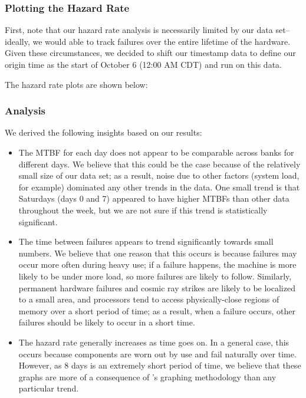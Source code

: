 \subsubsection{Plotting the Hazard Rate}

First, note that our hazard rate analysis is necessarily limited by our data set--ideally, we would able to track failures over the entire lifetime of the hardware.  Given these circumstances, we decided to shift our timestamp data to define our origin time as the start of October 6 (12:00 AM CDT) and run  on this data.

The hazard rate plots are shown below:

\subsubsection{Analysis}

We derived the following insights based on our results:

\begin{itemize}
\item The MTBF for each day does not appear to be comparable across banks for different days.  We believe that this could be the case because of the relatively small size of our data set; as a result, noise due to other factors (system load, for example) dominated any other trends in the data.  One small trend is that Saturdays (days 0 and 7) appeared to have higher MTBFs than other data throughout the week, but we are not sure if this trend is statistically significant.
\item The time between failures appears to trend significantly towards small numbers.  We believe that one reason that this occurs is because failures may occur more often during heavy use; if a failure happens, the machine is more likely to be under more load, so more failures are likely to follow.  Similarly, permanent hardware failures and cosmic ray strikes are likely to be localized to a small area, and processors tend to access physically-close regions of memory over a short period of time; as a result, when a failure occurs, other failures should be likely to occur in a short time.
\item The hazard rate generally increases as time goes on.  In a general case, this occurs because components are worn out by use and fail naturally over time.  However, as 8 days is an extremely short period of time, we believe that these graphs are more of a consequence of 's graphing methodology than any particular trend. 
\end{itemize}
